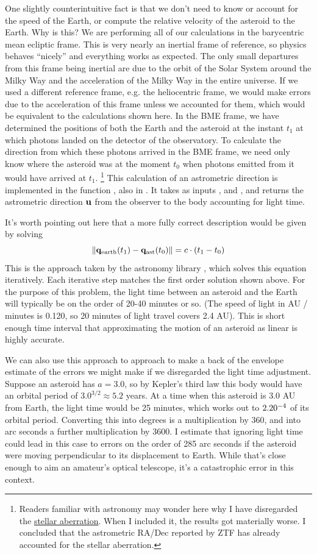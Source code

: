 One slightly counterintuitive fact is that we don't need to know or account for the speed of the Earth, 
or compute the relative velocity of the asteroid to the Earth. 
Why is this?
We are performing all of our calculations in the barycentric mean ecliptic frame.
This is very nearly an inertial frame of reference, so physics behaves ``nicely'' and everything works as expected.
The only small departures from this frame being inertial are due to the orbit of the Solar System around the Milky Way
and the acceleration of the Milky Way in the entire universe.
If we used a different reference frame, e.g. the heliocentric frame, we would make errors due to the acceleration of this frame 
unless we accounted for them, which would be equivalent to the calculations shown here.
In the BME frame, we have determined the positions of both the Earth and the asteroid at the instant $t_1$ at which 
photons landed on the detector of the observatory.
To calculate the direction from which these photons arrived in the BME frame, we need only know where the asteroid was at the moment
$t_0$ when photons emitted from it would have arrived at $t_1$.
\footnote{Readers familiar with astronomy may wonder here why I have disregarded the 
\href{https://en.wikipedia.org/wiki/Aberration_(astronomy)}{stellar aberration}.
When I included it, the results got materially worse.
I concluded that the astrometric RA/Dec reported by ZTF has already accounted for the stellar aberration.}
This calculation of an astrometric direction is implemented in the function , also in .
It takes as inputs ,  and , and returns the astrometric direction $\mathbf{u}$
from the observer to the body accounting for light time.

It's worth pointing out here that a more fully correct description would be given by solving
$$ \lVert\mathbf{q}_{\mathrm{earth}}(t_1) - \mathbf{q}_{\mathrm{ast}}(t_0)\rVert = c \cdot (t_1 - t_0) $$
This is the approach taken by the astronomy library , which solves this equation iteratively.
Each iterative step matches the first order solution shown above.
For the purpose of this problem, the light time between an asteroid and the Earth will typically be on the order of 20-40 minutes or so.
(The speed of light in AU / minutes is 0.120, so 20 minutes of light travel covers 2.4 AU).
This is short enough time interval that approximating the motion of an asteroid as linear is highly accurate.

We can also use this approach to approach to make a back of the envelope estimate of the errors we might make if 
we disregarded the light time adjustment.
Suppose an asteroid has $a=3.0$, so by Kepler's third law this body would have an orbital period of $3.0^{3/2} \approx 5.2$ years.
At a time when this asteroid is 3.0 AU from Earth, the light time would be 25 minutes, which works out to $2.20 \time 10^{-4}$ of its orbital period.
Converting this into degrees is a multiplication by 360, and into arc seconds a further multiplication by 3600.
I estimate that ignoring light time could lead in this case to errors on the order of 285 arc seconds 
if the asteroid were moving perpendicular to its displacement to Earth.
While that's close enough to aim an amateur's optical telescope, it's a catastrophic error in this context.

